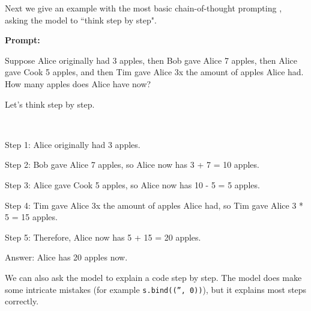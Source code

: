Next we give an example with the most basic chain-of-thought prompting \cite{wei2022chain}, asking the model to ``think step by step".

\begin{AIbox}{}
\textbf{\color{purple}Prompt:}\\ \tt{\color{purple}\footnotesize Suppose Alice originally had 3 apples, then Bob gave Alice 7 apples, then Alice gave Cook 5
apples, and then Tim gave Alice 3x the amount of apples Alice had. How many apples does Alice have now?

Let’s think step by step.}
\\
\begin{minipage}[t]{0.99\linewidth}
Step 1: Alice originally had 3 apples.

Step 2: Bob gave Alice 7 apples, so Alice now has 3 + 7 = 10 apples.

Step 3: Alice gave Cook 5 apples, so Alice now has 10 - 5 = 5 apples.

Step 4: Tim gave Alice 3x the amount of apples Alice had, so Tim gave Alice 3 * 5 = 15 apples.

Step 5: Therefore, Alice now has 5 + 15 = 20 apples.

Answer: Alice has 20 apples now.
\end{minipage}
\end{AIbox}
\clearpage

We can also ask the model to explain a code step by step. The model does make some intricate mistakes (for example \texttt{s.bind(('', 0))}), but it explains most steps correctly.

